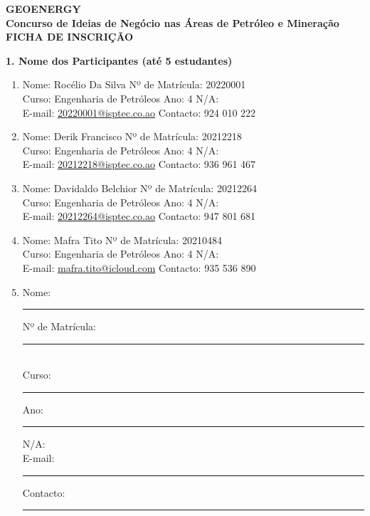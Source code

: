 \documentclass[11pt,a4paper]{article}
\newcommand{\blankline}[1]{\rule{#1}{0.5pt}}
\newcommand{\checkbox}{\fbox{\rule{0pt}{1.2ex}\hspace{1.2ex}}}
\begin{document}
\begin{center}
    {\Large\textbf{GEOENERGY}}\\[0.3em]
    {\large\textbf{Concurso de Ideias de Negócio nas Áreas de Petróleo e Mineração}}\\[0.2em]
    {\large\textbf{FICHA DE INSCRIÇÃO}}\\[1em]
\end{center}

\vspace{0.5em}

\textbf{1. Nome dos Participantes (até 5 estudantes)}

\begin{enumerate}[leftmargin=*,label=\textbf{Estudante \arabic*:}, itemsep=0.7em]
    \item Nome: Rocélio Da Silva \hfill Nº de Matrícula: 20220001 \\
    Curso: Engenharia de Petróleos \hfill Ano: 4 \hfill N/A: \checkbox \\
    E-mail: \href{mailto:20220001@isptec.co.ao}{20220001@isptec.co.ao} \hfill Contacto: 924 010 222

    \item Nome: Derik Francisco \hfill Nº de Matrícula: 20212218 \\
    Curso: Engenharia de Petróleos \hfill Ano: 4 \hfill N/A: \checkbox \\
    E-mail: \href{mailto:20212218@isptec.co.ao}{20212218@isptec.co.ao} \hfill Contacto: 936 961 467

    \item Nome: Davidaldo Belchior \hfill Nº de Matrícula: 20212264 \\
    Curso: Engenharia de Petróleos \hfill Ano: 4 \hfill N/A: \checkbox \\
    E-mail: \href{mailto:20212264@isptec.co.ao}{20212264@isptec.co.ao} \hfill Contacto: 947 801 681

    \item Nome: Mafra Tito \hfill Nº de Matrícula: 20210484 \\
    Curso: Engenharia de Petróleos \hfill Ano: 4 \hfill N/A: \checkbox \\
    E-mail: \href{mailto:mafra.tito@icloud.com}{mafra.tito@icloud.com} \hfill Contacto: 935 536 890

    \item Nome: \blankline{9.5cm} \hfill Nº de Matrícula: \blankline{2.2cm} \\
    Curso: \blankline{4.4cm} \hfill Ano: \blankline{1.1cm} \hfill N/A: \checkbox \\
    E-mail: \blankline{6.1cm} \hfill Contacto: \blankline{4.1cm}
\end{enumerate}
\end{document}
